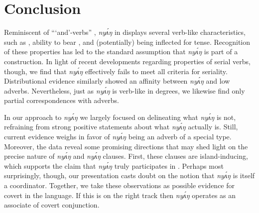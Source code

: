 \documentclass[output=paper,modfonts,nonflat,
]{langsci/langscibook}
\begin{document}
\section{Conclusion}\label{sec:duncan-et-al:6}


Reminiscent of  ```and'-verbs'' \citep{brown2008verbs}, \textit{ny\'{ʌ}ŋ} in  displays several verb-like characteristics, such as , ability to bear , and (potentially) being inflected for tense. Recognition of these properties has led to the standard assumption that \textit{ny\'{ʌ}ŋ} is part of a  construction. In light of recent developments regarding properties of  serial verbs, though, we find that \textit{ny\'{ʌ}ŋ} effectively fails to meet all criteria for seriality. Distributional evidence similarly showed an affinity between \textit{ny\'{ʌ}ŋ} and low adverbs. Nevertheless, just as \textit{ny\'{ʌ}ŋ} is verb-like in degrees, we likewise find only partial correspondences with adverbs.

In our approach to \textit{ny\'{ʌ}ŋ} we largely focused on delineating what \textit{ny\'{ʌ}ŋ} is not, refraining from strong positive statements about what \textit{ny\'{ʌ}ŋ} actually is. Still, current evidence weighs in favor of \textit{ny\'{ʌ}ŋ} being an adverb of a special type. Moreover, the data reveal some promising directions that may shed light on the precise nature of \textit{ny\'{ʌ}ŋ} and \textit{ny\'{ʌ}ŋ} clauses. First, these clauses are island-inducing, which supports the claim that \textit{ny\'{ʌ}ŋ} truly participates in . Perhaps most surprisingly, though, our presentation casts doubt on the notion that \textit{ny\'{ʌ}ŋ} is itself a coordinator. Together, we take these observations as possible evidence for covert  in the language. If this is on the right track then \textit{ny\'{ʌ}ŋ} operates as an associate of covert conjunction. 
\end{document}

